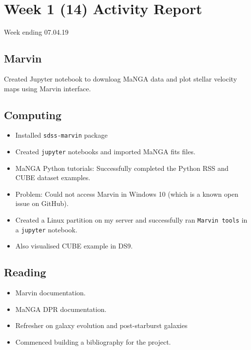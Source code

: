 \section{Week 1 (14) Activity Report}
Week ending 07.04.19
\subsection{Marvin}
Created Jupyter notebook to downloag MaNGA data and plot stellar velocity maps using Marvin interface.

\subsection{Computing}
\begin{itemize}
    \item Installed \texttt{sdss-marvin} package
    \item Created \texttt{jupyter} notebooks and imported MaNGA fits files.
    \item MaNGA Python tutorials: Successfully completed the Python RSS and CUBE dataset examples.
    \item Problem: Could not access Marvin \citep{brian_cherinka_2018_1146705} in Windows 10 (which is a known open issue on GitHub).
    \item Created a Linux partition on my server and successfully ran \texttt{Marvin tools} in a \texttt{jupyter} notebook.
    \item Also visualised CUBE example in DS9.
\end{itemize}
\subsection{Reading}
\begin{itemize}
    \item Marvin documentation.
    \item MaNGA DPR documentation.
    \item Refresher on galaxy evolution and post-starburst galaxies \citep{sparke2007galaxies}
    \item Commenced building a bibliography for the project.
\end{itemize}    
